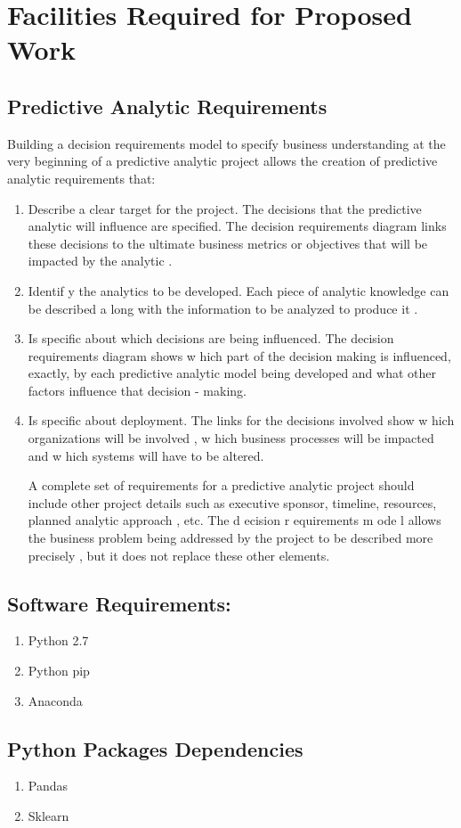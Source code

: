 \chapter{Facilities Required for Proposed Work}
\section{Predictive Analytic Requirements}
Building a decision requirements model 
to specify business understanding at the very beginning 
of 
a predictive analytic project allows the creation of predictive analytic requirements that:\begin{enumerate} 
	\item Describe a clear target for the project.
The 
decisions that the predictive analytic will 
influence are specified. The decision requirements diagram links these decisions to the 
ultimate business metrics or objectives that will be impacted by the analytic
.
	
	\item Identif
y
the analytics to be developed.
Each 
piece of analytic knowledge can be 
described a
long with the information to be analyzed to produce 
it
.
	
	\item Is specific about which decisions are being influenced.
The decision requirements 
diagram shows w
hich part of the 
decision making is influenced, exactly, 
by each 
predictive analytic model being developed and what other factors influence that 
decision
-
making.
	
	\item Is specific about deployment.
The links for the decisions involved show w
hich 
organizations will be involved
, w
hich business processes will be impacted
and w
hich 
systems will have to be altered.

A complete set of requirements for a predictive analytic project 
should include other project 
details such as executive sponsor, timeline, resources, planned analytic approach
, 
etc. The 
d
ecision 
r
equirements 
m
ode
l allows the business 
problem being addressed by 
the project to be 
described more precisely
,
but it does not replace these other elements.
	
\end{enumerate}

\section{Software Requirements:}
\begin{enumerate}
\item Python 2.7
\item Python pip
\item Anaconda
\end{enumerate}

\section{Python Packages Dependencies}
\begin{enumerate}
\item Pandas
\item Sklearn
\end{enumerate}

